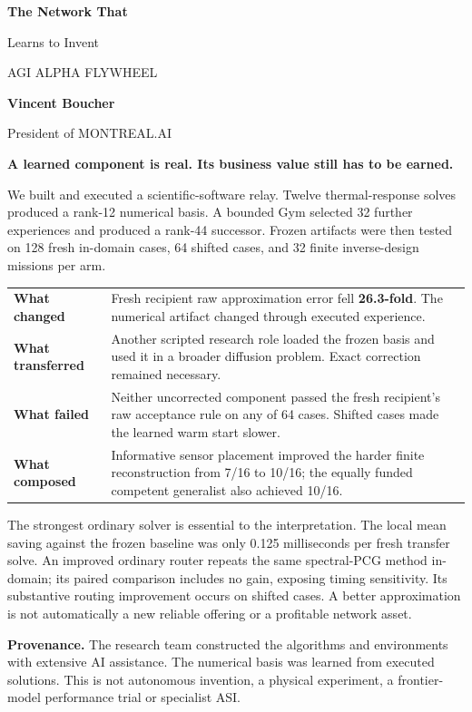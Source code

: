 \documentclass[11pt,letterpaper]{article}
\begin{document}
{\sffamily\bfseries\color{navy}\fontsize{25}{29}\selectfont The Network That\par Learns to Invent}\par
{\large AGI ALPHA FLYWHEEL}\par
\textbf{Vincent Boucher}\par President of MONTREAL.AI

{\large\sffamily\bfseries\color{navy}A learned component is real. Its business value still has to be earned.}

We built and executed a scientific-software relay. Twelve thermal-response solves produced a rank-12 numerical basis. A bounded Gym selected 32 further experiences and produced a rank-44 successor. Frozen artifacts were then tested on 128 fresh in-domain cases, 64 shifted cases, and 32 finite inverse-design missions per arm.

\begin{tabular}{p{.22\linewidth}p{.71\linewidth}}
\toprule
\textbf{What changed} & Fresh recipient raw approximation error fell \textbf{26.3-fold}. The numerical artifact changed through executed experience. \\
\textbf{What transferred} & Another scripted research role loaded the frozen basis and used it in a broader diffusion problem. Exact correction remained necessary. \\
\textbf{What failed} & Neither uncorrected component passed the fresh recipient's raw acceptance rule on any of 64 cases. Shifted cases made the learned warm start slower. \\
\textbf{What composed} & Informative sensor placement improved the harder finite reconstruction from 7/16 to 10/16; the equally funded competent generalist also achieved 10/16. \\
\bottomrule
\end{tabular}

The strongest ordinary solver is essential to the interpretation. The local mean saving against the frozen baseline was only 0.125 milliseconds per fresh transfer solve. An improved ordinary router repeats the same spectral-PCG method in-domain; its paired comparison includes no gain, exposing timing sensitivity. Its substantive routing improvement occurs on shifted cases. A better approximation is not automatically a new reliable offering or a profitable network asset.

\textbf{Provenance.} The research team constructed the algorithms and environments with extensive AI assistance. The numerical basis was learned from executed solutions. This is not autonomous invention, a physical experiment, a frontier-model performance trial or specialist ASI.
\end{document}
